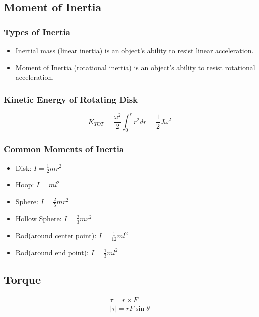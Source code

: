 \documentclass[../Notes.tex]{subfiles}
\begin{document}
    \subsection{Moment of Inertia}
    \subsubsection{Types of Inertia}
    \begin{itemize}
        \item Inertial mass (linear inertia) is an object's ability to resist 
            linear acceleration.
        \item Moment of Inertia (rotational inertia) is an object's ability to resist 
            rotational acceleration.
    \end{itemize}

    \subsubsection{Kinetic Energy of Rotating Disk}
    \begin{equation*}
        K_{TOT} = \frac{\omega^2}{2} \int_0^r r^2 dr = \frac12 J \omega^2
    \end{equation*}

    \subsubsection{Common Moments of Inertia}
    \begin{itemize}
        \item Disk: $I = \frac12 mr^2$
        \item Hoop: $I = ml^2$ 
        \item Sphere: $I = \frac25 m r^2$
        \item Hollow Sphere: $I = \frac23 m r^2$
        \item Rod(around center point): $I = \frac1{12} m l^2$
        \item Rod(around end point): $I = \frac13 m l^2$
    \end{itemize}

    \subsection{Torque}
    \begin{align*}
        \tau = r \times F \\
        |\tau| = rF\sin \theta
    \end{align*}
\end{document}
